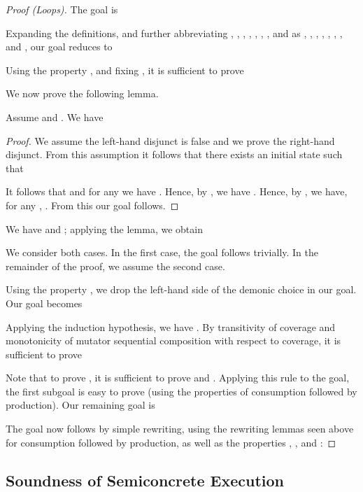 \documentclass{CSML}
\theoremstyle{definition}\newtheorem{notation}[thm]{Notation}
\theoremstyle{plain}\newtheorem{satz}[thm]{Satz}
\begin{document}
\begin{proof}[Proof (Loops)]
The goal is

Expanding the definitions, and further abbreviating
, , , , , ,
, and
  as
, , , , , , , and ,
our goal reduces to

Using the property , and fixing ,
it is sufficient to prove
\smallskip

\noindent We now prove the following lemma.
\begin{lem}
Assume  and . We have

\end{lem}
\begin{proof}
We assume the left-hand disjunct is false and we prove the right-hand disjunct.
From this assumption it follows that there exists an initial state  such that

It follows that  and for any  we have
.
Hence, by , we have
.
Hence, by , we have, for any ,
.
From this our goal follows.
\end{proof}

We have  and
; applying the lemma, we obtain

We consider both cases. In the first case, the goal follows trivially. In the remainder of the proof, we assume the second case.

Using the property ,
we drop the left-hand side of the demonic choice in our goal. Our goal becomes

Applying the induction hypothesis, we have
 .
By transitivity of coverage and monotonicity of mutator sequential composition with respect to coverage, it is sufficient to prove


Note that to prove , it is sufficient to prove  and . Applying this
rule to the goal, the first subgoal is easy to prove (using the properties of consumption followed by production). Our remaining goal is


The goal now follows by simple rewriting, using the rewriting lemmas seen above for consumption followed by production,
as well as the properties ,
, and
:

\end{proof}

\subsection{Soundness of Semiconcrete Execution}

\begin{thm}

\end{thm}
\end{document}

